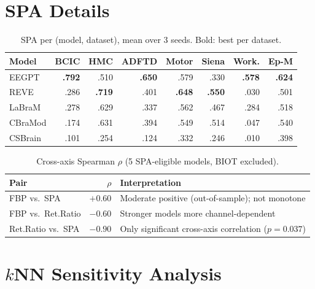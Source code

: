 \documentclass{article}
\begin{document}
\FloatBarrier
\section{SPA Details}
\label{app:spa_details}

\begin{table}[h]
  \caption{SPA per (model, dataset), mean over 3 seeds. Bold: best per dataset.}
  \centering\small
  \begin{tabular}{lrrrrrrr}
    \toprule
    Model & BCIC & HMC & ADFTD & Motor & Siena & Work. & Ep-M \\
    \midrule
    EEGPT & \textbf{.792} & .510 & \textbf{.650} & .579 & .330 & \textbf{.578} & \textbf{.624} \\
    REVE & .286 & \textbf{.719} & .401 & \textbf{.648} & \textbf{.550} & .030 & .501 \\
    LaBraM & .278 & .629 & .337 & .562 & .467 & .284 & .518 \\
    CBraMod & .174 & .631 & .394 & .549 & .514 & .047 & .540 \\
    CSBrain & .101 & .254 & .124 & .332 & .246 & .010 & .398 \\
    \bottomrule
  \end{tabular}
\end{table}

\begin{table}[h]
  \caption{Cross-axis Spearman $\rho$ (5 SPA-eligible models, BIOT excluded).}
  \centering\small
  \begin{tabular}{lrl}
    \toprule
    Pair & $\rho$ & Interpretation \\
    \midrule
    FBP vs.\ SPA & $+0.60$ & Moderate positive (out-of-sample); not monotone \\
    FBP vs.\ Ret.Ratio & $-0.60$ & Stronger models more channel-dependent \\
    Ret.Ratio vs.\ SPA & $-0.90$ & Only significant cross-axis correlation ($p=0.037$) \\
    \bottomrule
  \end{tabular}
\end{table}

\FloatBarrier
\section{$k$NN Sensitivity Analysis}
\label{app:k_sensitivity}
\end{document}
